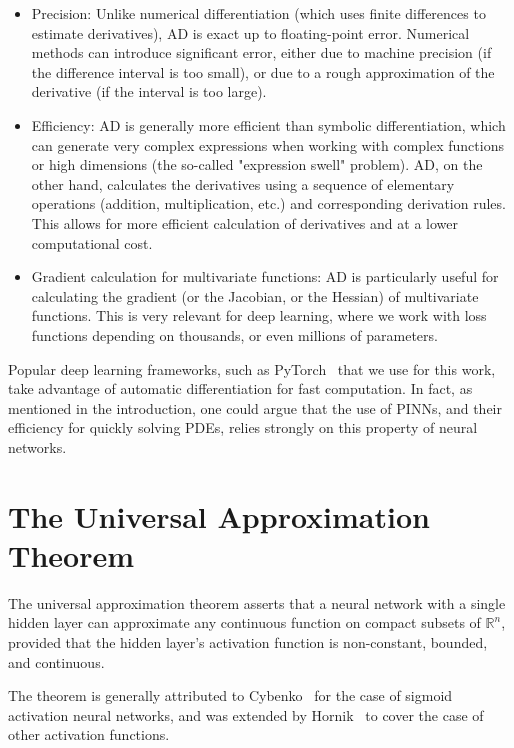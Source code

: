 \begin{itemize}
    \item Precision: Unlike numerical differentiation (which uses finite differences to estimate derivatives), AD is exact up to floating-point error. Numerical methods can introduce significant error, either due to machine precision (if the difference interval is too small), or due to a rough approximation of the derivative (if the interval is too large).
    \item Efficiency: AD is generally more efficient than symbolic differentiation, which can generate very complex expressions when working with complex functions or high dimensions (the so-called "expression swell" problem). AD, on the other hand, calculates the derivatives using a sequence of elementary operations (addition, multiplication, etc.) and corresponding derivation rules. This allows for more efficient calculation of derivatives and at a lower computational cost.
    \item Gradient calculation for multivariate functions: AD is particularly useful for calculating the gradient (or the Jacobian, or the Hessian) of multivariate functions. This is very relevant for deep learning, where we work with loss functions depending on thousands, or even millions of parameters.
\end{itemize}

Popular deep learning frameworks, such as PyTorch~\cite{NEURIPS2019_9015} that we use for this work, take advantage of automatic differentiation for fast computation. In fact, as mentioned in the introduction, one could argue that the use of PINNs, and their efficiency for quickly solving PDEs, relies strongly on this property of neural networks. 

\section{The Universal Approximation Theorem}\label{sec:univ-approx}
The universal approximation theorem asserts that a neural network with a single hidden layer can approximate any continuous function on compact subsets of $\mathbb{R}^n$, provided that the hidden layer's activation function is non-constant, bounded, and continuous.

The theorem is generally attributed to Cybenko~\cite{cybenko1989} for the case of sigmoid activation neural networks, and was extended by Hornik~\cite{hornik1991approximation} to cover the case of other activation functions.


